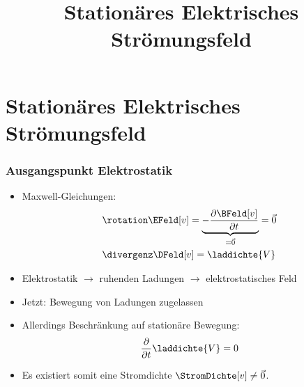 

\title[TET: Stationäres Elektrisches Strömungsfeld]{Stationäres Elektrisches Strömungsfeld}


% 
% 

\maketitle

% 
% 
\section{Stationäres Elektrisches Strömungsfeld}

\begin{frame}

  \frametitle{Ausgangspunkt Elektrostatik}

  \begin{itemize}[<+->]
    \item Maxwell-Gleichungen:
\begin{align*}
	& \rotation\EFeld[v] = \underbrace{-\dfrac{\partial \BFeld[v]}{\partial t}}_{=\vec{0}} = \vec{0} \\
	& \divergenz \DFeld[v] = \laddichte{V} 
\end{align*}
\item Elektrostatik $\to$ \alert{ruhenden} Ladungen $\to$ \alert{elektrostatisches Feld}
\item Jetzt: \alert{Bewegung von Ladungen zugelassen}
  \item Allerdings Beschränkung auf \alert{stationäre Bewegung}:
\begin{equation*}
	\dfrac{\partial}{\partial t} \laddichte{V} = 0 
      \end{equation*}
 \item Es existiert somit eine Stromdichte \alert{\(\StromDichte[v] \neq \vec{0} \)}.
\end{itemize}

\end{frame}

